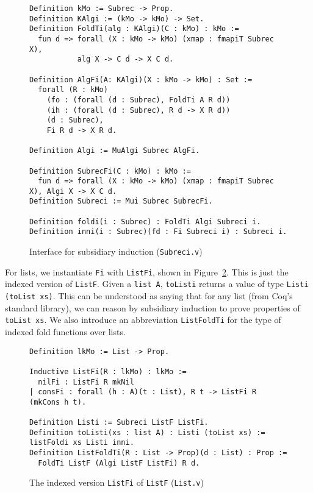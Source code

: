 \documentclass[a4paper,USenglish]{lipics-v2021}
\begin{document}
\begin{figure}
\begin{verbatim}
Definition kMo := Subrec -> Prop.
Definition KAlgi := (kMo -> kMo) -> Set.
Definition FoldTi(alg : KAlgi)(C : kMo) : kMo :=
  fun d => forall (X : kMo -> kMo) (xmap : fmapiT Subrec X),
           alg X -> C d -> X C d.

Definition AlgFi(A: KAlgi)(X : kMo -> kMo) : Set :=
  forall (R : kMo)
    (fo : (forall (d : Subrec), FoldTi A R d))
    (ih : (forall (d : Subrec), R d -> X R d))
    (d : Subrec),
    Fi R d -> X R d.

Definition Algi := MuAlgi Subrec AlgFi.

Definition SubrecFi(C : kMo) : kMo :=
  fun d => forall (X : kMo -> kMo) (xmap : fmapiT Subrec X), Algi X -> X C d.
Definition Subreci := Mui Subrec SubrecFi.

Definition foldi(i : Subrec) : FoldTi Algi Subreci i.
Definition inni(i : Subrec)(fd : Fi Subreci i) : Subreci i.
\end{verbatim}
\caption{Interface for subsidiary induction (\texttt{Subreci.v})}
\label{fig:subreci}
\end{figure}

For lists, we instantiate \verb|Fi| with \verb|ListFi|, shown in
Figure~\ref{fig:listfi}.  This is just the indexed version of
\verb|ListF|.  Given a \verb|list A|, \verb|toListi| returns
a value of type \verb|Listi (toList xs)|.  This can be understood
as saying that for any list (from Coq's standard library),
we can reason by subsidiary induction to prove properties of \verb|toList xs|.
We also introduce an abbreviation \verb|ListFoldTi| for the type
of indexed fold functions over lists.

\begin{figure}
\begin{verbatim}
Definition lkMo := List -> Prop.

Inductive ListFi(R : lkMo) : lkMo :=
  nilFi : ListFi R mkNil
| consFi : forall (h : A)(t : List), R t -> ListFi R (mkCons h t).

Definition Listi := Subreci ListF ListFi.
Definition toListi(xs : list A) : Listi (toList xs) := listFoldi xs Listi inni.
Definition ListFoldTi(R : List -> Prop)(d : List) : Prop :=
  FoldTi ListF (Algi ListF ListFi) R d.
\end{verbatim}
\caption{The indexed version \texttt{ListFi} of \texttt{ListF} (\texttt{List.v})}
\label{fig:listfi}
\end{figure}
\end{document}
